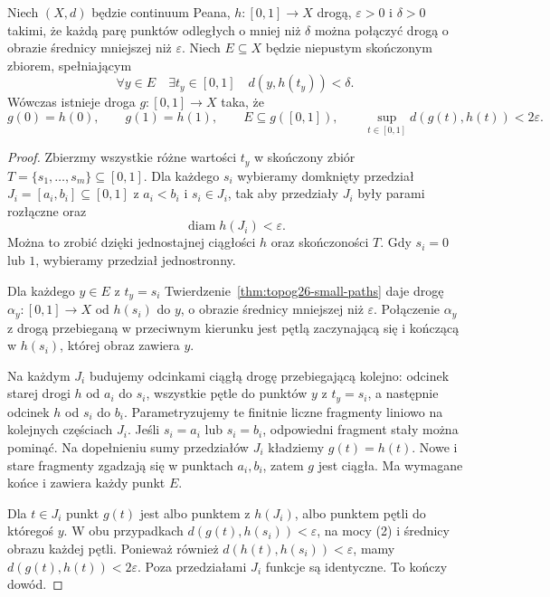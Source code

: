 \begin{lemat}
\label{lem:topog26-excursion}
Niech \((X,d)\) będzie continuum Peana,
\(h\colon[0,1]\to X\) drogą,
\(\varepsilon>0\) i \(\delta>0\)
takimi, że każdą parę punktów
odległych o mniej niż \(\delta\)
można połączyć drogą o obrazie
średnicy mniejszej niż \(\varepsilon\).
Niech \(E\subseteq X\)
będzie niepustym skończonym zbiorem,
spełniającym
\[
 \forall y\in E\quad
 \exists t_y\in[0,1]\quad
 d(y,h(t_y))<\delta.
\]
Wówczas istnieje droga
\(g\colon[0,1]\to X\)
taka, że
\[
 g(0)=h(0),\qquad g(1)=h(1),\qquad
 E\subseteq g([0,1]),\qquad
 \sup_{t\in[0,1]}d(g(t),h(t))<2\varepsilon.
\]
\end{lemat}
\begin{proof}
Zbierzmy wszystkie różne wartości
\(t_y\) w skończony zbiór
\(T=\{s_1,\ldots,s_m\}\subseteq[0,1]\).
Dla każdego \(s_i\) wybieramy
domknięty przedział
\(J_i=[a_i,b_i]\subseteq[0,1]\)
z \(a_i<b_i\) i \(s_i\in J_i\),
tak aby przedziały \(J_i\)
były parami rozłączne oraz
\[
 \operatorname{diam}h(J_i)<\varepsilon.
 \tag{2}
\]
Można to zrobić dzięki jednostajnej
ciągłości \(h\) oraz skończoności \(T\).
Gdy \(s_i=0\) lub \(1\),
wybieramy przedział jednostronny.

Dla każdego \(y\in E\) z \(t_y=s_i\)
Twierdzenie~\ref{thm:topog26-small-paths}
daje drogę
\(\alpha_y\colon[0,1]\to X\)
od \(h(s_i)\) do \(y\),
o obrazie średnicy mniejszej
niż \(\varepsilon\).
Połączenie \(\alpha_y\)
z drogą przebieganą w przeciwnym kierunku
jest pętlą zaczynającą się
i kończącą w \(h(s_i)\),
której obraz zawiera \(y\).

Na każdym \(J_i\) budujemy
odcinkami ciągłą drogę
przebiegającą kolejno:
odcinek starej drogi \(h\)
od \(a_i\) do \(s_i\),
wszystkie pętle do punktów
\(y\) z \(t_y=s_i\),
a następnie odcinek \(h\)
od \(s_i\) do \(b_i\).
Parametryzujemy te finitnie
liczne fragmenty liniowo
na kolejnych częściach \(J_i\).
Jeśli \(s_i=a_i\) lub \(s_i=b_i\),
odpowiedni fragment stały można pominąć.
Na dopełnieniu sumy przedziałów \(J_i\)
kładziemy \(g(t)=h(t)\).
Nowe i stare fragmenty zgadzają się
w punktach \(a_i,b_i\),
zatem \(g\) jest ciągła.
Ma wymagane końce i zawiera każdy punkt \(E\).

Dla \(t\in J_i\) punkt \(g(t)\)
jest albo punktem z \(h(J_i)\),
albo punktem pętli do któregoś \(y\).
W obu przypadkach
\(d(g(t),h(s_i))<\varepsilon\),
na mocy (2) i średnicy obrazu
każdej pętli.
Ponieważ również
\(d(h(t),h(s_i))<\varepsilon\),
mamy \(d(g(t),h(t))<2\varepsilon\).
Poza przedziałami \(J_i\)
funkcje są identyczne.
To kończy dowód.
\end{proof}

